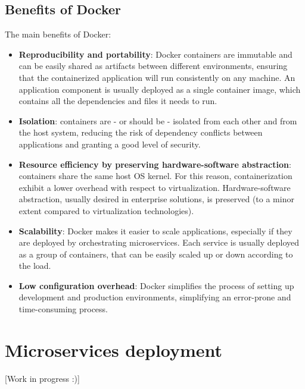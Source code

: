 \subsection{Benefits of Docker}
The main benefits of Docker:
\begin{itemize}
    \item \textbf{Reproducibility and portability}: Docker containers are immutable and can be easily shared as artifacts between different environments, ensuring that the containerized application will run consistently on any machine. An application component is usually deployed as a single container image, which contains all the dependencies and files it needs to run. 
    \item \textbf{Isolation}: containers are - or should be - isolated from each other and from the host system, reducing the risk of dependency conflicts between applications and granting a good level of security.
    \item \textbf{Resource efficiency by preserving hardware-software abstraction}: containers share the same host OS kernel. For this reason, containerization exhibit a lower overhead with respect to virtualization. Hardware-software abstraction, usually desired in enterprise solutions, is preserved (to a minor extent compared to virtualization technologies).
    \item \textbf{Scalability}: Docker makes it easier to scale applications, especially if they are deployed by orchestrating microservices. Each service is usually deployed as a group of containers, that can be easily scaled up or down according to the load. 
    \item \textbf{Low configuration overhead}: Docker simplifies the process of setting up development and production environments, simplifying an error-prone and time-consuming process.
\end{itemize}

\section{Microservices deployment}
[Work in progress :)]











